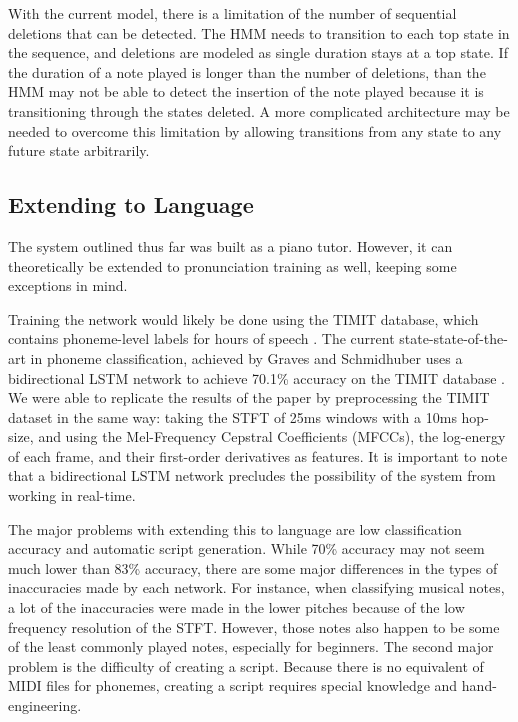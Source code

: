 \documentclass[twocolumn]{article}
\begin{document}
With the current model, there is a limitation of the number of sequential deletions that can be detected. The HMM needs to transition to each top state in the sequence, and deletions are modeled as single duration stays at a top state. If the duration of a note played is longer than the number of deletions, than the HMM may not be able to detect the insertion of the note played because it is transitioning through the states deleted. A more complicated architecture may be needed to overcome this limitation by allowing transitions from any state to any future state arbitrarily.

\subsection{Extending to Language}

The system outlined thus far was built as a piano tutor. However, it can theoretically be extended to pronunciation training as well, keeping some exceptions in mind.

Training the network would likely be done using the TIMIT database, which contains phoneme-level labels for hours of speech \cite{garofolo1993darpa}. The current state-state-of-the-art in phoneme classification, achieved by Graves and Schmidhuber uses a bidirectional LSTM network to achieve 70.1\% accuracy on the TIMIT database \cite{graves2005framewise}. We were able to replicate the results of the paper by preprocessing the TIMIT dataset in the same way: taking the STFT of 25ms windows with a 10ms hop-size, and using the Mel-Frequency Cepstral Coefficients (MFCCs), the log-energy of each frame, and their first-order derivatives as features. It is important to note that a bidirectional LSTM network precludes the possibility of the system from working in real-time.

The major problems with extending this to language are low classification accuracy and automatic script generation. While 70\% accuracy may not seem much lower than 83\% accuracy, there are some major differences in the types of inaccuracies made by each network. For instance, when classifying musical notes, a lot of the inaccuracies were made in the lower pitches because of the low frequency resolution of the STFT. However, those notes also happen to be some of the least commonly played notes, especially for beginners. The second major problem is the difficulty of creating a script. Because there is no equivalent of MIDI files for phonemes, creating a script requires special knowledge and hand-engineering.
\end{document}
